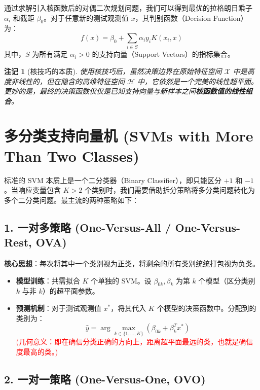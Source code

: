 \documentclass[UTF8]{ctexart}
\newtheorem{remark}{注记}[section]
\numberwithin{equation}{section}
\begin{document}
通过求解引入核函数后的对偶二次规划问题，我们可以得到最优的拉格朗日乘子 $\alpha_i$ 和截距 $\beta_0$。对于任意新的测试观测值 $x$，其判别函数（Decision Function）为：
\begin{equation}
    f(x) = \beta_0 + \sum_{i \in S} \alpha_i y_i K(x_i, x)
\end{equation}
其中，$S$ 为所有满足 $\alpha_i > 0$ 的支持向量（Support Vectors）的指标集合。

\begin{remark}[核技巧的本质]
使用核技巧后，虽然决策边界在原始特征空间 $\mathcal{X}$ 中是高度非线性的，但在隐含的高维特征空间 $\mathcal{H}$ 中，它依然是一个完美的线性超平面。更妙的是，最终的决策函数仅仅是已知支持向量与新样本之间\textbf{核函数值的线性组合}。
\end{remark}

\vspace{2em}

\section{多分类支持向量机 (SVMs with More Than Two Classes)}

标准的 SVM 本质上是一个二分类器（Binary Classifier），即只能区分 $+1$ 和 $-1$。当响应变量包含 $K > 2$ 个类别时，我们需要借助拆分策略将多分类问题转化为多个二分类问题。最主流的两种策略如下：

\subsection{1. 一对多策略 (One-Versus-All / One-Versus-Rest, OVA)}

\textbf{核心思想}：每次将其中一个类别视为正类，将剩余的所有类别统统打包视为负类。
\begin{itemize}
    \item \textbf{模型训练}：共需拟合 $K$ 个单独的 SVM。设 $\beta_{0k}, \beta_{k}$ 为第 $k$ 个模型（区分类别 $k$ 与非 $k$）的超平面参数。
    \item \textbf{预测机制}：对于测试观测值 $x^*$，将其代入 $K$ 个模型的决策函数中。分配到的类别为：
    $$ \hat{y} = \arg\max_{k \in \{1,\dots,K\}} (\beta_{0k} + \beta_k^T x^*) $$
    \textcolor{red}{(几何意义：即在确信分类正确的方向上，距离超平面最远的类，也就是确信度最高的类。)}
\end{itemize}

\subsection{2. 一对一策略 (One-Versus-One, OVO)}
\end{document}
